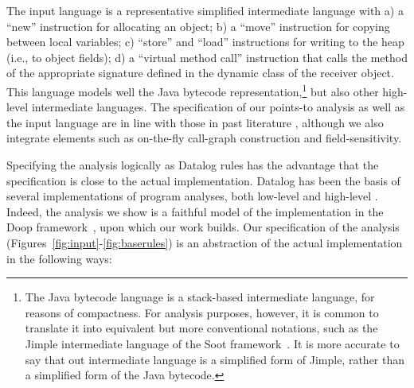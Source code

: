 The input language is a representative simplified intermediate
language with a) a ``new'' instruction for allocating an object; b) a
``move'' instruction for copying between local variables; c) ``store''
and ``load'' instructions for writing to the heap (i.e., to object
fields); d) a ``virtual method call'' instruction that calls the
method of the appropriate signature defined in the dynamic
class of the receiver object. This language models well the Java
bytecode representation,\footnote{The Java bytecode language is a
  stack-based intermediate language, for reasons of compactness.  For
  analysis purposes, however, it is common to translate it into
  equivalent but more conventional notations, such as the Jimple
  intermediate language of the Soot
  framework~\cite{cascon:1999:Vall,cc:2000:Vall}. It is more
  accurate to say that out intermediate language is a simplified form
  of Jimple, rather than a simplified form of the Java bytecode.} but
also other high-level intermediate languages. 
The specification of our points-to analysis as well as the input
language are in line with those in past literature
\cite{uss:2009:Guarnieri,tech:2012:Livshits}, although we also
integrate elements such as on-the-fly call-graph construction and
field-sensitivity.

Specifying the analysis logically as Datalog rules has the advantage
that the specification is close to the actual implementation.  Datalog
has been the basis of several implementations of program analyses,
both low-level
\cite{col:1994:Reps,aplas:2005:Whaley,pods:2005:Lam,pldi:2004:Whaley,oopsla:2009:Bravenboer}
and high-level \cite{icse:2008:Eichberg,ecoop:2006:Hajiyev}. Indeed, the analysis we show
is a faithful model of the implementation in the Doop
framework~\cite{oopsla:2009:Bravenboer}, upon which our work builds. Our
specification of the analysis
(Figures~\ref{fig:input}-\ref{fig:baserules}) is an abstraction of the
actual implementation in the following ways:

